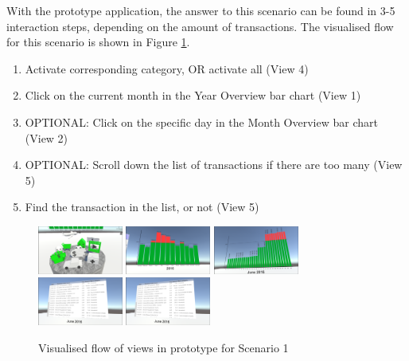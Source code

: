 With the prototype application, the answer to this scenario can be found in 3-5 interaction steps, depending on the amount of transactions. The visualised flow for this scenario is shown in Figure \ref{fig:scenariooneprototype}.
\begin{enumerate}
	\item Activate corresponding category, OR activate all (View 4)
	\item Click on the current month in the Year Overview bar chart (View 1)
	\item OPTIONAL: Click on the specific day in the Month Overview bar chart (View 2)
	\item OPTIONAL: Scroll down the list of transactions if there are too many (View 5)
	\item Find the transaction in the list, or not (View 5)
\end{enumerate}
\begin{figure}[h]
	\begin{center}
		\includegraphics[width=2.8cm]{03_Figures/08_Development/View4_CategoriesFiltering.png}
		\includegraphics[width=2.8cm]{03_Figures/08_Development/View1_YearOverview.png}
		\includegraphics[width=2.8cm]{03_Figures/08_Development/View2_MonthOverview.png}
		\includegraphics[width=2.8cm]{03_Figures/08_Development/View5_FinTransactionsOverview.png}
		\includegraphics[width=2.8cm]{03_Figures/08_Development/View5_FinTransactionsOverview.png}
		\caption{Visualised flow of views in prototype for Scenario 1}
		\label{fig:scenariooneprototype}
	\end{center}
\end{figure}


